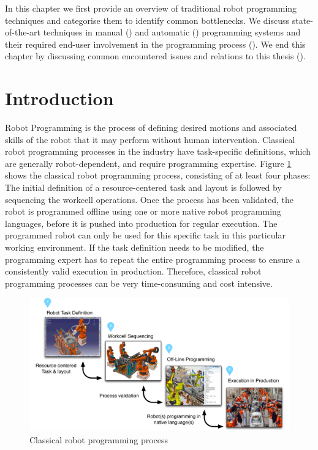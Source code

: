 In this chapter we first provide an overview of traditional robot programming techniques and categorise them to identify common bottlenecks.
We discuss state-of-the-art techniques in manual () and automatic () programming systems and their required end-user involvement in the programming process ().
We end this chapter by discussing common encountered issues and relations to this thesis ().

\section{Introduction}
Robot Programming is the process of defining desired motions and associated skills of the robot that it may perform without human intervention.
Classical robot programming processes in the industry have task-specific definitions, which are generally robot-dependent, and require programming expertise.
Figure \ref{fig:Classical robot programming process} shows the classical robot programming process, consisting of at least four phases:
The initial definition of a resource-centered task and layout is followed by sequencing the workcell operations.
Once the process has been validated, the robot is programmed offline using one or more native robot programming languages, before it is pushed into production for regular execution.
The programmed robot can only be used for this specific task in this particular working environment.
If the task definition needs to be modified, the programming expert has to repeat the entire programming process to ensure a consistently valid execution in production.
Therefore, classical robot programming processes can be very time-consuming and cost intensive.

\begin{figure}[ht]
	\centering
	\includegraphics[width=\linewidth]{figures/manual-programming}
	\caption{Classical robot programming process}
	\label{fig:Classical robot programming process}
\end{figure}

